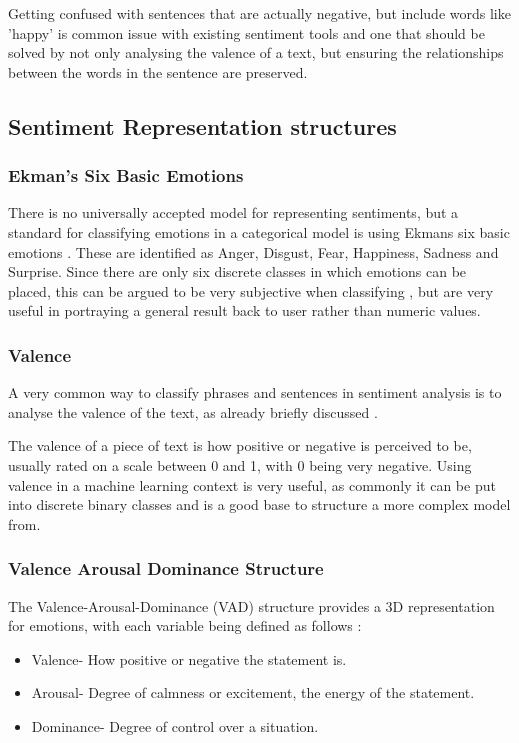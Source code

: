 Getting confused with sentences that are actually negative, but include words like 'happy' is common issue with existing sentiment tools and one that should be solved by not only analysing the valence of a text, but ensuring the relationships between the words in the sentence are preserved.

\subsection{Sentiment Representation structures}

\subsubsection{Ekman's Six Basic Emotions}

There is no universally accepted model for representing sentiments, but a standard for classifying emotions in a categorical model is using Ekmans six basic emotions \cite{Ekman}. These are identified as Anger, Disgust, Fear, Happiness, Sadness and Surprise. Since there are only six discrete classes in which emotions can be placed, this can be argued to be very subjective when classifying \cite{emoBank}, but are very useful in portraying a general result back to user rather than numeric values.

\subsubsection{Valence}
A very common way to classify phrases and sentences in sentiment analysis is to analyse the valence of the text, as already briefly discussed \cite{frijda1986emotions}.

The valence of a piece of text is how positive or negative is perceived to be, usually rated on a scale between 0 and 1, with 0 being very negative.
Using valence in a machine learning context is very useful, as commonly it can be put into discrete binary classes and is a good base to structure a more complex model from.

\subsubsection{Valence Arousal Dominance Structure}

The Valence-Arousal-Dominance (VAD) structure provides a 3D representation for emotions, with each variable being defined as follows \cite{VAD}:
\begin{itemize}
    \item Valence- How positive or negative the statement is.
    \item Arousal- Degree of calmness or excitement, the energy of the statement. 
    \item Dominance- Degree of control over a situation.
\end{itemize}

